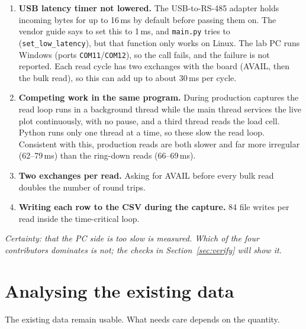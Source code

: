 \documentclass[11pt]{article}
\newcommand{\code}[1]{\texttt{#1}}
\begin{document}
\begin{enumerate}
  \item \textbf{USB latency timer not lowered.} The USB-to-RS-485 adapter
        holds incoming bytes for up to 16\,ms by default before passing them
        on. The vendor guide says to set this to 1\,ms, and \code{main.py}
        tries to (\code{set\_low\_latency}), but that function only works on
        Linux. The lab PC runs Windows (ports \code{COM11}/\code{COM12}), so
        the call fails, and the failure is not reported. Each read cycle has
        two exchanges with the board (AVAIL, then the bulk read), so this can
        add up to about 30\,ms per cycle.
  \item \textbf{Competing work in the same program.} During production
        captures the read loop runs in a background thread while the main
        thread services the live plot continuously, with no pause, and a
        third thread reads the load cell. Python runs only one thread at a
        time, so these slow the read loop. Consistent with this, production
        reads are both slower and far more irregular (62--79\,ms) than the
        ring-down reads (66--69\,ms).
  \item \textbf{Two exchanges per read.} Asking for AVAIL before every bulk
        read doubles the number of round trips.
  \item \textbf{Writing each row to the CSV during the capture.} 84 file
        writes per read inside the time-critical loop.
\end{enumerate}

\textit{Certainty: that the PC side is too slow is measured. Which of the
four contributors dominates is not; the checks in
Section~\ref{sec:verify} will show it.}

\section{Analysing the existing data}

The existing data remain usable. What needs care depends on the quantity.
\end{document}
